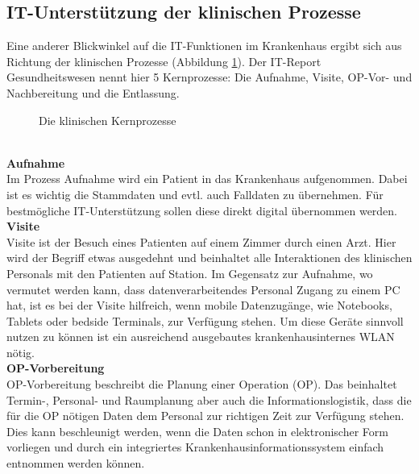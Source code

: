 \subsection{IT-Unterstützung der klinischen Prozesse}
\label{sec:klinischeProzesse}
	Eine anderer Blickwinkel auf die IT-Funktionen im Krankenhaus ergibt sich aus Richtung der klinischen Prozesse (Abbildung \ref{fig:kernprozesse}). Der IT-Report Gesundheitswesen \parencite{huebner2019} nennt hier 5 Kernprozesse: Die Aufnahme, Visite, OP-Vor- und Nachbereitung und die Entlassung.
 \begin{figure}[h]
 	\centering
 	\caption{Die klinischen Kernprozesse \parencite[41]{huebner2018}}
 	\label{fig:kernprozesse}
 \end{figure}
	\vspace{\parheadvspace}\\
	\textbf{Aufnahme}\\
		Im Prozess Aufnahme wird ein Patient in das Krankenhaus aufgenommen. Dabei ist es wichtig die Stammdaten und evtl. auch Falldaten zu übernehmen. Für bestmögliche IT-Unterstützung sollen diese direkt digital übernommen werden.
	\vspace{\parheadvspace}\\
	\textbf{Visite}\\
		Visite ist der Besuch eines Patienten auf einem Zimmer durch einen Arzt. Hier wird der Begriff etwas ausgedehnt und beinhaltet alle Interaktionen des klinischen Personals mit den Patienten auf Station. Im Gegensatz zur Aufnahme, wo vermutet werden kann, dass datenverarbeitendes Personal Zugang zu einem PC hat, ist es bei der Visite hilfreich, wenn mobile Datenzugänge, wie Notebooks, Tablets oder bedside Terminals, zur Verfügung stehen. Um diese Geräte sinnvoll nutzen zu können ist ein ausreichend ausgebautes krankenhausinternes WLAN nötig.
	\vspace{\parheadvspace}\\
	\textbf{OP-Vorbereitung}\\
		OP-Vorbereitung beschreibt die Planung einer Operation (OP). Das beinhaltet Termin-, Personal- und Raumplanung aber auch die Informationslogistik, dass die für die OP nötigen Daten dem Personal zur richtigen Zeit zur Verfügung stehen. Dies kann beschleunigt werden, wenn die Daten schon in elektronischer Form vorliegen und durch ein integriertes Krankenhausinformationssystem einfach entnommen werden können.
	\vspace{\parheadvspace}\\
